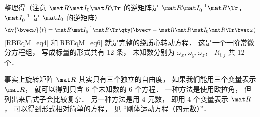 整理得（注意 $\mat R \mat I_0 \mat R\Tr$ 的逆矩阵是 $\mat R \mat I_0^{-1} \mat R\Tr$， $\mat I_0^{-1}$ 是 $\mat I_0$ 的逆矩阵）%
\begin{equation}\label{RBEqM_eq6}
\dv{\bvec \omega}{t} = \mat R \mat I_0^{-1} \mat R\Tr \qty(\bvec \tau  - \mat \Omega \mat R \mat I_0 \mat R\Tr \bvec\omega)
\end{equation}
\autoref{RBEqM_eq4} 和\autoref{RBEqM_eq6} 就是完整的绕质心转动方程． 这是一个一阶常微分方程组， 写成标量的形式共有 12 条， 未知数分别为 $\omega_x, \omega_y, \omega_z$， $R_{i,j}$ 共 12 个．

事实上旋转矩阵 $\mat R$ 其实只有三个独立的自由度， 如果我们能用三个变量表示 $\mat R$， 就可以得到只含 6 个未知数的 6 个方程． 一种方法是使用欧拉角， 但列出来后式子会比较复杂． 另一种方法是用 4 元数， 即用 4 个变量表示 $\mat R$， 可以得到形式相对简单的方程， 见 “刚体运动方程（四元数）”．
